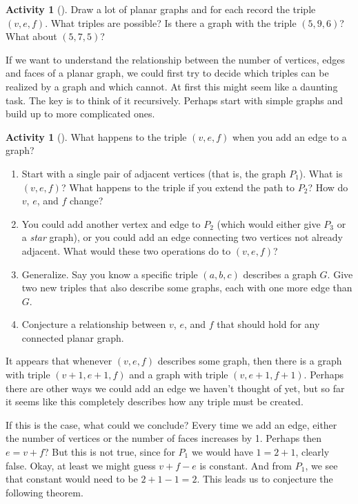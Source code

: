 \documentclass[10pt,]{book}
\theoremstyle{plain}
\theoremstyle{definition}
\theoremstyle{definition}
\theoremstyle{definition}
\newtheorem{activity}[project]{Activity}
\numberwithin{equation}{chapter}
\begin{document}
\begin{activity}[]\label{activity-15}
\hypertarget{p-213}{}%
Draw a lot of planar graphs and for each record the triple \((v,e,f)\).  What triples are possible? Is there a graph with the triple \((5, 9, 6)\)?  What about \((5,7,5)\)?%
\end{activity}
\hypertarget{p-214}{}%
If we want to understand the relationship between the number of vertices, edges and faces of a planar graph, we could first try to decide which triples can be realized by a graph and which cannot.  At first this might seem like a daunting task.  The key is to think of it recursively.  Perhaps start with simple graphs and build up to more complicated ones.%
\begin{activity}[]\label{activity-16}
\hypertarget{p-215}{}%
What happens to the triple \((v,e,f)\) when you add an edge to a graph?%
\begin{enumerate}[font=\bfseries,label=(\alph*),ref=\alph*]
\item\label{task-22} \hypertarget{p-216}{}%
Start with a single pair of adjacent vertices (that is, the graph \(P_1\)).  What is \((v,e,f)\)?  What happens to the triple if you extend the path to \(P_2\)?  How do \(v\), \(e\), and \(f\) change?%
\item\label{task-23} \hypertarget{p-217}{}%
You could add another vertex and edge to \(P_2\) (which would either give \(P_3\) or a \emph{star} graph), or you could add an edge connecting two vertices not already adjacent.  What would these two operations do to \((v,e,f)\)?%
\item\label{task-24} \hypertarget{p-218}{}%
Generalize.  Say you know a specific triple \((a,b,c)\) describes a graph \(G\).  Give two new triples that also describe some graphs, each with one more edge than \(G\).%
\item\label{task-25} \hypertarget{p-219}{}%
Conjecture a relationship between \(v\), \(e\), and \(f\) that should hold for any connected planar graph.%
\end{enumerate}
\end{activity}
\hypertarget{p-220}{}%
It appears that whenever \((v,e,f)\) describes some graph, then there is a graph with triple \((v+1, e+1, f)\) and a graph with triple \((v,e+1, f+1)\).  Perhaps there are other ways we could add an edge we haven't thought of yet, but so far it seems like this completely describes how any triple must be created.%
\par
\hypertarget{p-221}{}%
If this is the case, what could we conclude?  Every time we add an edge, either the number of vertices or the number of faces increases by 1.  Perhaps then \(e = v + f\)?  But this is not true, since for \(P_1\) we would have \(1 = 2 + 1\), clearly false.  Okay, at least we might guess \(v + f - e\) is constant.  And from \(P_1\), we see that constant would need to be \(2 + 1 - 1 = 2\).  This leads us to conjecture the following theorem.%
\end{document}
